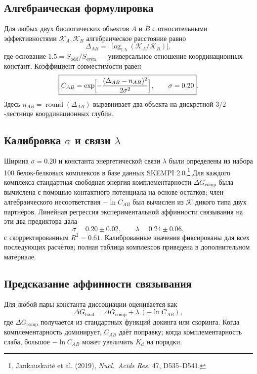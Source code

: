 \documentclass[12pt,a4paper]{article}
\newcommand{\REL}{\mathcal{K}}          %
\begin{document}
	\subsection{Алгебраическая формулировка}
	Для любых двух биологических объектов \(A\) и \(B\) с относительными эффективностями \(\REL_A,\REL_B\) алгебраическое расстояние равно
	\[
	\Delta_{AB} = \bigl|\log_{1.5}(\REL_A/\REL_B)\bigr|,
	\]
	где основание \(1.5 = S_{\mathrm{odd}}/S_{\mathrm{even}}\) — универсальное отношение координационных констант. Коэффициент совместимости равен
	\begin{equation}
		\boxed{C_{AB} = \exp\!\Bigl[-\frac{(\Delta_{AB}-n_{AB})^2}{2\sigma^2}\Bigr],\qquad \sigma = 0.20}.
		\label{eq:Cab}
	\end{equation}
	Здесь \(n_{AB} = \operatorname{round}(\Delta_{AB})\) выравнивает два объекта на дискретной \(3/2\)-лестнице координационных глубин.
	
	\subsection{Калибровка \(\sigma\) и связи \(\lambda\)}
	Ширина \(\sigma = 0.20\) и константа энергетической связи \(\lambda\) были определены из набора 100 белок-белковых комплексов в базе данных SKEMPI 2.0.\footnote{Jankauskaitė et al. (2019), \emph{Nucl.\ Acids Res.} 47, D535–D541.} Для каждого комплекса стандартная свободная энергия комплементарности \(\Delta G_{\mathrm{comp}}\) была вычислена с помощью контактного потенциала на основе остатков; член алгебраического несоответствия \(-\ln C_{AB}\) был вычислен из \(\REL\) дикого типа двух партнёров. Линейная регрессия экспериментальной аффинности связывания на эти два предиктора дала
	\[
	\sigma = 0.20 \pm 0.02,\qquad \lambda = 0.24 \pm 0.06,
	\]
	с скорректированным \(R^2 = 0.61\).
	Калиброванные значения фиксированы для всех последующих расчётов; полная таблица комплексов приведена в дополнительном материале.
	
	\subsection{Предсказание аффинности связывания}
	Для любой пары константа диссоциации оценивается как
	\[
	\Delta G_{\mathrm{bind}} = \Delta G_{\mathrm{comp}} + \lambda\,(-\ln C_{AB}),
	\label{eq:Kd}
	\]
	где \(\Delta G_{\mathrm{comp}}\) получается из стандартных функций докинга или скоринга. Когда комплементарность доминирует, \(C_{AB}\) даёт поправку; когда комплементарность слаба, большое \(-\ln C_{AB}\) может увеличить \(K_d\) на порядки.
	
\end{document}
